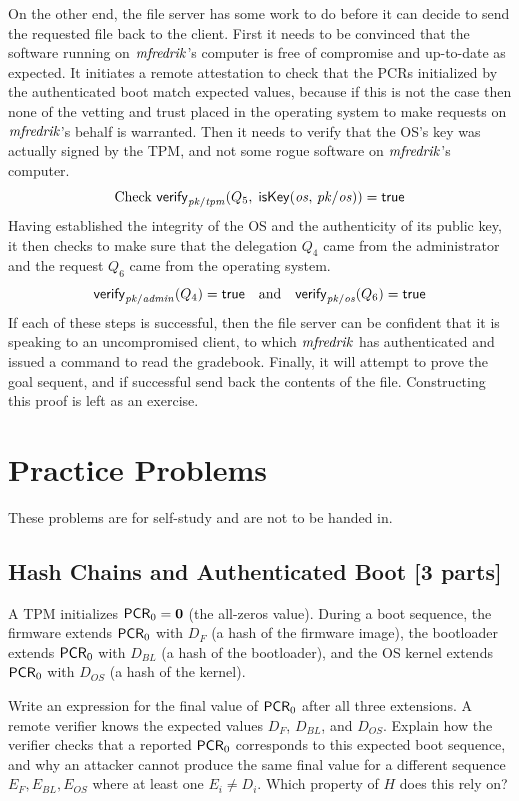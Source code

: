 \documentclass[11pt]{article}
\newcommand{\pk}[1]{\ensuremath{\mi{pk/#1}}}
\newcommand{\verify}[1]{\ms{verify}_{#1}}
\newcommand{\iskey}[2]{\ms{isKey}(#1,\, #2)}
\newcommand{\pcr}[1]{\ms{PCR}_{#1}}
\begin{document}
On the other end, the file server has some work to do before it can decide to send the requested file back to the client. First it needs to be convinced that the software running on $\mathit{mfredrik}$'s computer is free of compromise and up-to-date as expected. It initiates a remote attestation to check that the PCRs initialized by the authenticated boot match expected values, because if this is not the case then none of the vetting and trust placed in the operating system to make requests on $\mathit{mfredrik}$'s behalf is warranted. Then it needs to verify that the OS's key was actually signed by the TPM, and not some rogue software on $\mathit{mfredrik}$'s computer.
\[
  \text{Check}~\verify{\pk{tpm}}(Q_5,\; \iskey{\mi{os}}{\pk{os}}) = \ms{true}
\]
Having established the integrity of the OS and the authenticity of its public key, it then checks to make sure that the delegation $Q_4$ came from the administrator and the request $Q_6$ came from the operating system.
\[
  \verify{\pk{admin}}(Q_4) = \ms{true}
  \quad\mbox{and}\quad
  \verify{\pk{os}}(Q_6) = \ms{true}
\]
If each of these steps is successful, then the file server can be confident that it is speaking to an uncompromised client, to which $\mathit{mfredrik}$ has authenticated and issued a command to read the gradebook. Finally, it will attempt to prove the goal sequent, and if successful send back the contents of the file. Constructing this proof is left as an exercise.

\section{Practice Problems}

These problems are for self-study and are not to be handed in.

\subsection{Hash Chains and Authenticated Boot [3 parts]}

A TPM initializes $\pcr{0} = \mathbf{0}$ (the all-zeros value).
During a boot sequence, the firmware extends $\pcr{0}$ with $D_F$ (a
hash of the firmware image), the bootloader extends $\pcr{0}$ with
$D_{BL}$ (a hash of the bootloader), and the OS kernel extends
$\pcr{0}$ with $D_{OS}$ (a hash of the kernel).

\begin{task}\rm
  \label{task:hash1}
  Write an expression for the final value of $\pcr{0}$ after all
  three extensions.  A remote verifier knows the expected values
  $D_F$, $D_{BL}$, and $D_{OS}$.  Explain how the verifier checks
  that a reported $\pcr{0}$ corresponds to this expected boot
  sequence, and why an attacker cannot produce the same final value
  for a different sequence $E_F, E_{BL}, E_{OS}$ where at least one
  $E_i \neq D_i$.  Which property of $H$ does this rely on?
\end{task}
\end{document}
